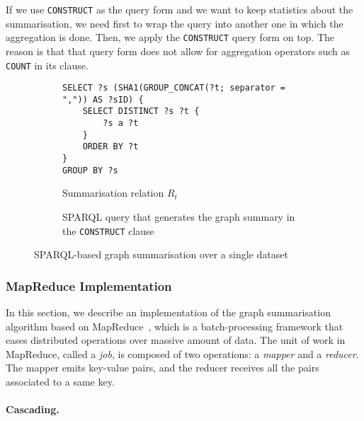 \begin{remark}
If we use \texttt{CONSTRUCT} as the query form and we want to keep statistics about the summarisation, we need first to wrap the query into another one in which the aggregation is done. Then, we apply the \texttt{CONSTRUCT} query form on top. The reason is that that query form does not allow for aggregation operators such as \texttt{COUNT} in its clause.
\end{remark}

\begin{figure}
	\centering
	\begin{subfigure}{\textwidth}
		\centering
		{\footnotesize
			\begin{verbatim}
SELECT ?s (SHA1(GROUP_CONCAT(?t; separator = ",")) AS ?sID) {
    SELECT DISTINCT ?s ?t {
        ?s a ?t
    }
    ORDER BY ?t
}
GROUP BY ?s
			\end{verbatim}
		}
		\caption{Summarisation relation $R_t$}
		\label{chap4:summary:fig:relation-sparql}
	\end{subfigure}
	\qquad
	\begin{subfigure}{\textwidth}
		\centering
		{\footnotesize
			
		}
		\caption{SPARQL query that generates the graph summary in the \texttt{CONSTRUCT} clause}
		\label{chap4:summary:fig:sparql-gs}
	\end{subfigure}
	\caption{SPARQL-based graph summarisation over a single dataset}
	\label{chap4:summary:fig:gs-sparql-all}
\end{figure}

\subsubsection{MapReduce Implementation}
\label{sec:mapreduce}

In this section, we describe an implementation of the graph summarisation algorithm based on MapReduce~\cite{dean:2004:msd}, which is a batch-processing framework that eases distributed operations over massive amount of data. The unit of work in MapReduce, called a \emph{job}, is composed of two operations: a \emph{mapper} and a \emph{reducer}. The mapper emits key-value pairs, and the reducer receives all the pairs associated to a same key.

\paragraph{Cascading.}

